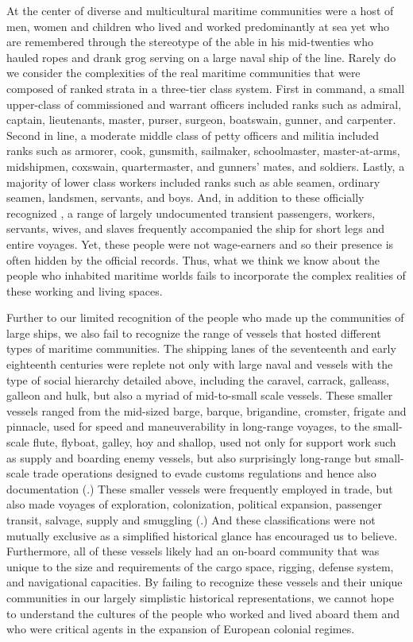 At the center of diverse and multicultural maritime communities were a host of men, women and children who lived and worked predominantly at sea yet who are remembered through the stereotype of the able  in his mid-twenties who hauled ropes and drank grog serving on a large naval ship of the line. Rarely do we consider the complexities of the real maritime communities that were composed of ranked strata in a three-tier class system. First in command, a small upper-class of commissioned and warrant officers included ranks such as admiral, captain, lieutenants, master, purser, surgeon, boatswain, gunner, and carpenter. Second in line, a moderate middle class of petty officers and militia included ranks such as armorer, cook, gunsmith, sailmaker, schoolmaster, master-at-arms, midshipmen, coxswain, quartermaster, and gunners’ mates, and soldiers. Lastly, a majority of lower class workers included ranks such as able seamen, ordinary seamen, landsmen, servants, and boys. And, in addition to these officially recognized , a range of largely undocumented transient passengers, workers, servants, wives, and slaves frequently accompanied the ship for short legs and entire voyages. Yet, these people were not wage-earners and so their presence is often hidden by the official records. Thus, what we think we know about the people who inhabited maritime worlds fails to incorporate the complex realities of these working and living spaces.  



Further to our limited recognition of the people who made up the communities of large ships, we also fail to recognize the range of vessels that hosted different types of maritime communities. The shipping lanes of the seventeenth and early eighteenth centuries were replete not only with large naval and  vessels with the type of social hierarchy detailed above, including the caravel, carrack, galleass, galleon and hulk, but also a myriad of mid-to-small scale vessels. These smaller vessels ranged from the mid-sized barge, barque, brigandine, cromster, frigate and pinnacle, used for speed and maneuverability in long-range voyages, to the small-scale flute, flyboat, galley, hoy and shallop, used not only for support work such as supply and boarding enemy vessels, but also surprisingly long-range but small-scale trade operations designed to evade customs regulations and hence also documentation (\citealt{Bicheno2012}.) These smaller vessels were frequently employed in trade, but also made voyages of exploration, colonization, political expansion, passenger transit, salvage, supply and smuggling (\citealt{Jarvis2010}.) And these classifications were not mutually exclusive as a simplified historical glance has encouraged us to believe. Furthermore, all of these vessels likely had an on-board community that was unique to the size and requirements of the cargo space, rigging, defense system, and navigational capacities. By failing to recognize these vessels and their unique communities in our largely simplistic historical representations, we cannot hope to understand the cultures of the people who worked and lived aboard them and who were critical agents in the expansion of European colonial regimes. 



